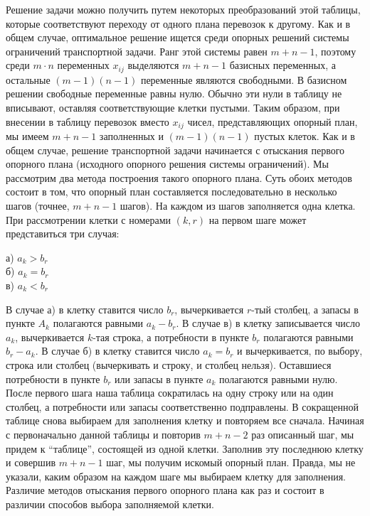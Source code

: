 Решение задачи можно получить путем некоторых преобразований этой таблицы, которые соответствуют переходу от одного  плана перевозок к другому. Как и в общем случае, оптимальное решение ищется среди опорных решений системы ограничений транспортной  задачи. Ранг этой системы равен $m + n - 1$, поэтому среди $m\cdot n$ переменных $x_{ij}$ выделяются $m + n - 1$ базисных переменных, а остальные $(m - 1)(n - 1)$ переменные являются свободными. В базисном решении свободные  переменные равны нулю. Обычно эти нули в таблицу не вписывают, оставляя соответствующие клетки пустыми. Таким образом, при внесении в  таблицу перевозок вместо $x_{ij}$  чисел, представляющих опорный план, мы имеем $m + n - 1$ заполненных   и $(m - 1)(n - 1)$ пустых клеток. Как и в общем случае, решение транспортной  задачи  начинается  с отыскания первого опорного плана (исходного опорного решения системы ограничений). Мы рассмотрим два метода построения такого опорного  плана. Суть обоих методов состоит в том, что опорный план составляется последовательно в несколько шагов (точнее, $m + n - 1$ шагов). На каждом из шагов заполняется одна клетка. При рассмотрении клетки с номерами $(k,r)$ на первом шаге может представиться три случая:

\begin{center}
а) $a_k > b_r$\\ б) $a_k = b_r$\\ в) $a_k < b_r$
\end{center}

В случае а) в клетку ставится число $b_r$, вычеркивается $r$-тый столбец, а запасы в пункте $A_k$ полагаются равными $a_k - b_r$. В случае в) в клетку  записывается число $a_k$, вычеркивается $k$-тая строка, а потребности в пункте $b_r$ полагаются равными $b_r - a_k$. В случае б) в клетку ставится число $a_k = b_r$ и вычеркивается, по выбору, строка или столбец (вычеркивать и строку, и столбец нельзя). Оставшиеся  потребности  в пункте $b_r$ или запасы в пункте $a_k$ полагаются равными нулю. После первого шага наша таблица сократилась на одну строку  или на один столбец, а потребности или запасы соответственно подправлены. В сокращенной таблице снова выбираем для заполнения  клетку и  повторяем все сначала. Начиная с первоначально  данной  таблицы и  повторив $m + n - 2$ раз описанный шаг, мы придем к “таблице”, состоящей из одной клетки. Заполнив эту последнюю клетку и совершив $m + n - 1$ шаг, мы получим искомый опорный план. Правда, мы не указали, каким образом на каждом шаге мы выбираем клетку для  заполнения. Различие  методов отыскания первого опорного плана как раз и состоит в различии способов выбора заполняемой клетки.

